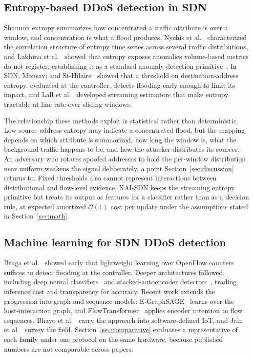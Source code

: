 \documentclass{ieeeaccess}
\begin{document}
\subsection{Entropy-based DDoS detection in SDN}
Shannon entropy summarizes how concentrated a traffic attribute is over a window, and concentration is what a flood produces. Nychis et al.~\cite{nychis2008entropy} characterized the correlation structure of entropy time series across several traffic distributions, and Lakhina et al.~\cite{lakhina2005mining} showed that entropy exposes anomalies volume-based metrics do not register, establishing it as a standard anomaly-detection primitive~\cite{bhuyan2014network}. In SDN, Mousavi and St-Hilaire~\cite{mousavi2015early} showed that a threshold on destination-address entropy, evaluated at the controller, detects flooding early enough to limit its impact, and Lall et al.~\cite{lall2006entropy} developed streaming estimators that make entropy tractable at line rate over sliding windows.

The relationship these methods exploit is statistical rather than deterministic. Low source-address entropy may indicate a concentrated flood, but the mapping depends on which attribute is summarized, how long the window is, what the background traffic happens to be, and how the attacker distributes its sources. An adversary who rotates spoofed addresses to hold the per-window distribution near uniform weakens the signal deliberately, a point Section~\ref{sec:discussion} returns to. Fixed thresholds also cannot represent interactions between distributional and flow-level evidence. XAI-SDN keeps the streaming entropy primitive but treats its output as features for a classifier rather than as a decision rule, at expected amortized $\mathcal{O}(1)$ cost per update under the assumptions stated in Section~\ref{sec:math}.

\subsection{Machine learning for SDN DDoS detection}
Braga et al.~\cite{braga2010lightweight} showed early that lightweight learning over OpenFlow counters suffices to detect flooding at the controller. Deeper architectures followed, including deep neural classifiers~\cite{tang2016deep} and stacked-autoencoder detectors~\cite{niyaz2017deep}, trading inference cost and transparency for accuracy. Recent work extends the progression into graph and sequence models: E-GraphSAGE~\cite{lo2022egraphsage} learns over the host-interaction graph, and FlowTransformer~\cite{manocchio2024flowtransformer} applies encoder attention to flow sequences. Bhayo et al.~\cite{bhayo2023sdiot} carry the approach into software-defined IoT, and Jain et al.~\cite{jain2024ddossurvey} survey the field. Section~\ref{sec:comparative} evaluates a representative of each family under one protocol on the same hardware, because published numbers are not comparable across papers.
\end{document}
